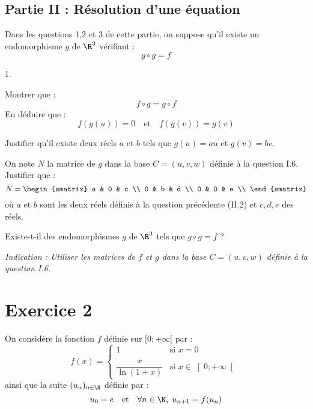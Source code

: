 \documentclass[11pt]{article}%
\begin{document}
\subsection*{Partie II : Résolution d'une équation}

\noindent Dans les questions 1,2 et 3 de cette partie, on suppose qu'il
existe un endomorphisme $g$ de $\R^{3}$ vérifiant : 
\[
 g\circ g = f 
\]

\begin{noliste}{1.}
 \setlength{\itemsep}{4mm}
\item Montrer que : 
\[
 f\circ g = g \circ f 
\]
En déduire que :
\[
 f(g(u)) = 0 \quad\text{et}\quad f(g(v)) = g(v) 
\]

\item Justifier qu'il existe deux réels $a$ et $b$ tels que $g(u) = au$
et $g(v) = bv$.

\item On note $N$ la matrice de $g$ dans la base $C = (u,v,w)$ définie
à la question I.6. Justifier que :
\[
 N = \begin{smatrix}
a & 0 & c \\
0 & b & d \\
0 & 0 & e \\
\end{smatrix}
\]
où $a$ et $b$ sont les deux réels définis à la question précédente
(II.2) et $c,d,e$ des réels.

\item Existe-t-il des endomorphismes $g$ de $\R^{3}$ tels que $g\circ g
= f$ ?

\textit{Indication : Utiliser les matrices de $f$ et $g$ dans la base
$C = (u,v,w)$ définie à la question I.6.}
\end{noliste}

\section*{Exercice 2}

\noindent On considère la fonction $f$ définie sur $[0; + \infty[$ par
:
\[
 f(x) = \left\{ 
\begin{array}{cl}
 1 & \text{si }x = 0 \\
 & \\
\dfrac{x}{\ln(1 + x)} & \text{si }x\in \left]0; + \infty\right[ \
\end{array}
\right. 
\]
ainsi que la suite $(u_{n})_{n\in \N}$ définie par :
\[
 u_{0} = e \quad\text{et}\quad \forall n\in \N,\; u_{n + 1} = f(u_{n}) 
\]
\end{document}
